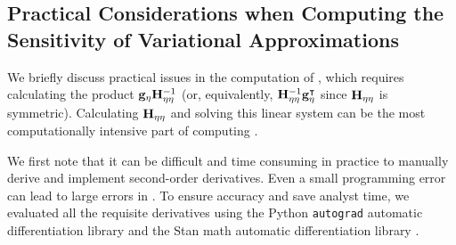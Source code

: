 \documentclass{article}\usepackage[]{graphicx}\usepackage[]{color}
\theoremstyle{definition}
\theoremstyle{plain}
\theoremstyle{plain}
\theoremstyle{plain}
\theoremstyle{definition}
\theoremstyle{plain}
\theoremstyle{plain}
\begin{document}
\subsection{Practical Considerations when Computing the Sensitivity
of Variational Approximations\label{subsec:lrvb_implementation}}

We briefly discuss practical issues in the computation of
, which requires calculating the product
$\mathbf{g}_{\eta}\mathbf{H}_{\eta\eta}^{-1}$ (or, equivalently, $\mathbf{H}_{\eta\eta}^{-1}\mathbf{g}_{\eta}^{\intercal}$
since $\mathbf{H}_{\eta\eta}$ is symmetric). Calculating $\mathbf{H}_{\eta\eta}$ and solving
this linear system can be the most computationally intensive part
of computing .

We first note that it can be difficult and time consuming in practice
to manually derive and implement second-order derivatives. Even a
small programming error can lead to large errors in .
To ensure accuracy and save analyst time, we evaluated all the requisite
derivatives using the Python \texttt{autograd} automatic differentiation
library \citep{maclaurin:2015:autograd} and the Stan math automatic
differentiation library \citep{carpenter:2015:stan}.
\end{document}

